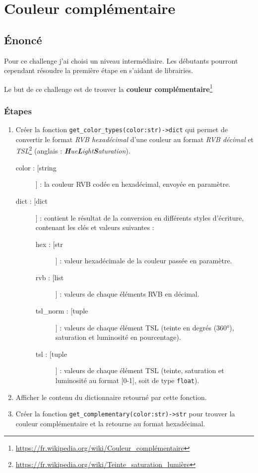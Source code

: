 \chapter{Couleur complémentaire}
\vspace{2cm}
\section{Énoncé}
Pour ce challenge j’ai choisi un niveau intermédiaire. Les débutants pourront cependant résoudre la première étape en s’aidant de librairies.
\medskip

Le but de ce challenge est de trouver la \textbf{couleur complémentaire}\footnote{\url{https://fr.wikipedia.org/wiki/Couleur_complémentaire}}
\medskip

\subsection*{Étapes}
\begin{enumerate}
	\item Créer la fonction \verb|get_color_types(color:str)->dict| qui permet de convertir le format \textit{RVB hexadécimal} d’une couleur au format \textit{RVB décimal} et \textit{TSL}\footnote{\url{https://fr.wikipedia.org/wiki/Teinte_saturation_lumière}} (anglais : \textit{\textbf{H}ue\textbf{L}ight\textbf{S}aturation}).
	\begin{description}
		\item[\textbullet{} color : [string]] : la couleur RVB codée en hexadécimal, envoyée en paramètre.
		\item[\textbullet{} dict : [dict]] : contient le résultat de la conversion en différents styles d'écriture, contenant les clés et valeurs suivantes :
		\begin{description}
			\item[hex : [str]] : valeur hexadécimale de la couleur passée en paramètre.
			\item[rvb : [list]] : valeurs de chaque éléments RVB en décimal.
			\item[tsl\_norm : [tuple]] : valeurs de chaque élément TSL (teinte en degrés (360°), saturation et luminosité en pourcentage).
			\item[tsl : [tuple]] : valeurs de chaque élément TSL (teinte, saturation et luminosité au format [0-1], soit de type \texttt{float}).
		\end{description}
	\end{description}
	\medskip
	
	\item Afficher le contenu du dictionnaire retourné par cette fonction.
	\medskip
	
	\item Créer la fonction \verb|get_complementary(color:str)->str| pour trouver la couleur complémentaire et la retourne au format hexadécimal.
\end{enumerate}
\medskip

